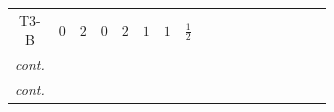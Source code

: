 \documentclass[8pt]{article}
\begin{document}
\begin{landscape}
\begin{longtable}{@{}cccccccc >{\raggedright\arraybackslash}p{0.21\linewidth} >{\raggedright\arraybackslash}p{0.21\linewidth} >{\raggedright\arraybackslash}p{0.21\linewidth}@{}}
\midrule
T3-B & $0$ & $2$ & $0$ & $2$ & $1$ & $1$ & $\frac{1}{2}$ & \scriptsize\adjustbox{max width=\linewidth}{$\begin{gathered} +\frac{\hbar  H_{a_1} H_{a_2} H_{a_1}{}^{\dagger } H_{a_2}{}^{\dagger } \left(\lambda_{H1}^{(1)}\right){}^2}{2 \epsilon } \\ +\frac{5 \hbar  H_{a_1} H_{a_2} H_{a_1}{}^{\dagger } H_{a_2}{}^{\dagger } \left(\lambda_{H1}^{(2)}\right){}^2}{6 \epsilon } \\ +\frac{\hbar  H_{a_1} H_{a_2} H_{a_1}{}^{\dagger } H_{a_2}{}^{\dagger } \left(\lambda_{H2}^{(1)}\right){}^2}{2 \epsilon }\end{gathered}$} & \scriptsize\adjustbox{max width=\linewidth}{$\begin{gathered} -\frac{5 \hbar  B_{\mu _1\mu _2}^2}{12 \epsilon }\end{gathered}$} & \scriptsize\adjustbox{max width=\linewidth}{$\begin{gathered} -\frac{\hbar  \left(W_{\mu _1\mu _2}^{A_1}\right){}^2}{12 \epsilon }\end{gathered}$} \\
\textit{cont.} &  &  &  &  &  &  &  & \scriptsize\adjustbox{max width=\linewidth}{$\begin{gathered} +\frac{5 \hbar  H_{a_1} H_{a_2} H_{a_1}{}^{\dagger } H_{a_2}{}^{\dagger } \left(\lambda_{H2}^{(2)}\right){}^2}{6 \epsilon } \\ +C_{\text{H2}} H_{a_1} H_{a_1}{}^{\dagger } \\ -H_{a_1} \mu ^2 H_{a_1}{}^{\dagger }\end{gathered}$} &  &  \\
\textit{cont.} &  &  &  &  &  &  &  & \scriptsize\adjustbox{max width=\linewidth}{$\begin{gathered} +\frac{4 \hbar  \overline{\lambda_{T3}} H_{a_1} H_{a_2} \lambda_{T3} H_{a_1}{}^{\dagger } H_{a_2}{}^{\dagger }}{3 \epsilon } \\ +\frac{\hbar  H_{a_1} H_{a_2} H_{a_1}{}^{\dagger } H_{a_2}{}^{\dagger } \lambda_{H1}^{(1)} \lambda_{H1}^{(2)}}{\sqrt{3} \epsilon } \\ +\frac{\hbar  H_{a_1} H_{a_2} H_{a_1}{}^{\dagger } H_{a_2}{}^{\dagger } \lambda_{H2}^{(1)} \lambda_{H2}^{(2)}}{\sqrt{3} \epsilon }\end{gathered}$} &  &  \\
\midrule

\end{longtable}
\end{landscape}
\end{document}
